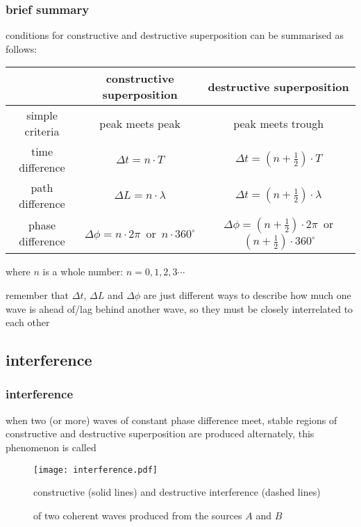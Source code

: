\subsubsection*{brief summary}

conditions for constructive and destructive superposition can be summarised as follows:

\begin{center}
{\renewcommand{\arraystretch}{1.25}
\begin{tabular}{|c|c|c|}
	\hline
	& constructive superposition & destructive superposition \\
	\hline
	simple criteria & peak meets peak & peak meets trough \\
	\hline
	time difference & $\Delta t = n \cdot T$ & $\Delta t = \left(n+\frac{1}{2}\right) \cdot T$ \\
	\hline
	path difference & $\Delta L = n \cdot \lambda$ & $\Delta t = \left(n+\frac{1}{2}\right) \cdot \lambda$ \\
	\hline
	phase difference & $\Delta \phi = n\cdot 2\pi\,$ or $\,n\cdot 360^\circ$ & $\Delta \phi = \left(n+\frac{1}{2}\right)\cdot 2\pi \,$ or $\,\left(n+\frac{1}{2}\right)\cdot 360^\circ$ \\
	\hline
\end{tabular}
}
\end{center}

where $n$ is a whole number: $n=0, 1, 2, 3 \cdots$

remember that $\Delta t$, $\Delta L$ and $\Delta \phi$ are just different ways to describe how much one wave is ahead of/lag behind another wave, so they must be closely interrelated to each other






\subsection{interference}

\subsubsection{interference}

when two (or more) waves of constant phase difference meet, stable regions of constructive and destructive superposition are produced alternately, this phenomenon is called 



\begin{figure}[htp]
	\centering
	\texttt{[image: interference.pdf]}
	
	constructive (solid lines) and destructive interference (dashed lines)
	
	of two coherent waves produced from the sources $A$ and $B$
\end{figure}

